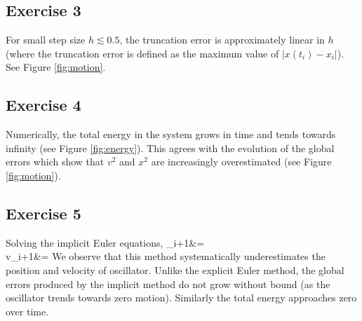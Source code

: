 \documentclass{article}
\def\bal#1\eal{\begin{align}#1\end{align}}
\theoremstyle{definition}
\begin{document}
\subsection*{Exercise 3}
For small step size $h\lesssim 0.5$, the truncation error is approximately linear in $h$ (where the truncation error is defined as the maximum value of $|x(t_i)-x_i|$). See Figure \ref{fig:motion}.

\subsection*{Exercise 4}
Numerically, the total energy in the system grows in time and tends towards infinity (see Figure \ref{fig:energy}). This agrees with the evolution of the global errors which show that $v^2$ and $x^2$ are increasingly overestimated (see Figure \ref{fig:motion}). 

\subsection*{Exercise 5}
Solving the implicit Euler equations,
\bal
x_{i+1}&=\\
v_{i+1}&=
\eal
We observe that this method systematically underestimates the position and velocity of oscillator. Unlike the explicit Euler method, the global errors produced by the implicit method do not grow without bound (as the oscillator trends towards zero motion). Similarly the total energy approaches zero over time. 
\end{document}
